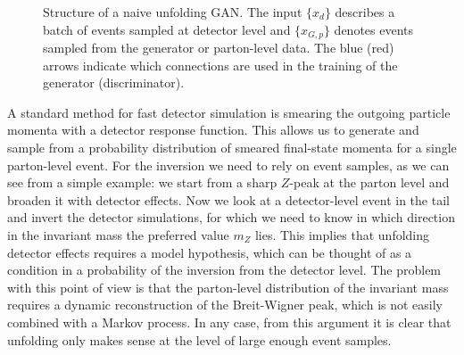 \begin{figure}[t]
\centering

\caption{Structure of a naive unfolding GAN. The input $\{ x_d \}$
  describes a batch of events sampled at detector level and $\{
  x_{G,p} \}$ denotes events sampled from the generator or
  parton-level data. The blue (red) arrows indicate which
  connections are used in the training of the generator
  (discriminator).}
\label{fig:GANs}
\end{figure}

A standard method for fast detector simulation is
smearing the outgoing particle momenta with a detector response
function. This allows us to generate and sample from a probability
distribution of smeared final-state momenta for a single parton-level
event. For the inversion we need to rely on event samples, as we can
see from a simple example: we start from a sharp $Z$-peak at the
parton level and broaden it with detector effects. Now we look at a
detector-level event in the tail and invert the detector simulations,
for which we need to know in which direction in the invariant mass the
preferred value $m_Z$ lies. This implies that unfolding detector
effects requires a model hypothesis, which can be thought of as a
condition in a probability of the inversion from the detector
level. The problem with this point of view is that the parton-level
distribution of the invariant mass requires a dynamic reconstruction
of the Breit-Wigner peak, which is not easily combined with a Markov
process. In any case, from this argument it is clear that unfolding
only makes sense at the level of large enough event samples.

